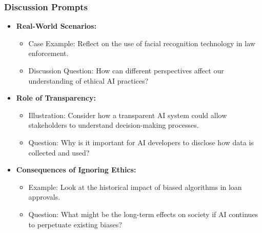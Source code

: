 \documentclass[aspectratio=169]{beamer}
\begin{document}
\begin{frame}[fragile]
    \frametitle{Discussion Prompts}
    \begin{itemize}
        \item \textbf{Real-World Scenarios:}
        \begin{itemize}
            \item Case Example: Reflect on the use of facial recognition technology in law enforcement.
            \item Discussion Question: How can different perspectives affect our understanding of ethical AI practices?
        \end{itemize}

        \item \textbf{Role of Transparency:}
        \begin{itemize}
            \item Illustration: Consider how a transparent AI system could allow stakeholders to understand decision-making processes.
            \item Question: Why is it important for AI developers to disclose how data is collected and used?
        \end{itemize}

        \item \textbf{Consequences of Ignoring Ethics:}
        \begin{itemize}
            \item Example: Look at the historical impact of biased algorithms in loan approvals.
            \item Question: What might be the long-term effects on society if AI continues to perpetuate existing biases?
        \end{itemize}
    \end{itemize}
\end{frame}
\end{document}
